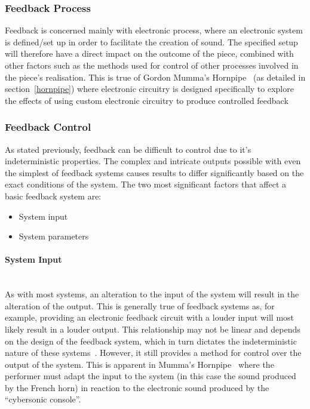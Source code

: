 \documentclass[titlepage]{scrartcl}
\begin{document}
    \subsubsection{Feedback Process}
    Feedback is concerned mainly with electronic process, where an electronic
    system is defined/set up in order to facilitate the creation of sound. The
    specified setup will therefore have a direct impact on the outcome of the
    piece, combined with other factors such as the methods used for control of other
    processes involved in the piece's realisation. This is true of Gordon
    Mumma's Hornpipe~\citeyearpar{mumma2002lem} (as detailed in
    section~\ref{hornpipe}) where electronic circuitry is designed specifically
    to explore the effects of using custom electronic circuitry to produce
    controlled feedback~\parencite[p.8, 390]{nyman1999em}

    \subsubsection{Feedback Control}
    As stated previously, feedback can be difficult to control due to it's
    indeterministic properties. The complex and intricate outputs possible with
    even the simplest of feedback systems causes results to differ
    significantly based on the exact conditions of the system. The two most
    significant factors that affect a basic feedback system are:
    \begin{itemize}
        \item System input
        \item System parameters
    \end{itemize}

    \paragraph{System Input}\mbox{}\\ 
    As with most systems, an alteration to the input of the system will result
    in the alteration of the output. This is generally true of feedback systems
    as, for example, providing an electronic feedback circuit with a louder
    input will most likely result in a louder output. This relationship may not
    be linear and depends on the design of the feedback system, which in turn
    dictates the indeterministic nature of these
    systems~\parencite[p.19-27]{weisert2010ioi}. However, it still provides a
    method for control over the output of the system. This is apparent in
    Mumma's Hornpipe~\citeyearpar{mumma2002lem} where the performer must adapt
    the input to the system (in this case the sound produced by the French
    horn) in reaction to the electronic sound produced by the ``cybersonic
    console''.
    
\end{document}

